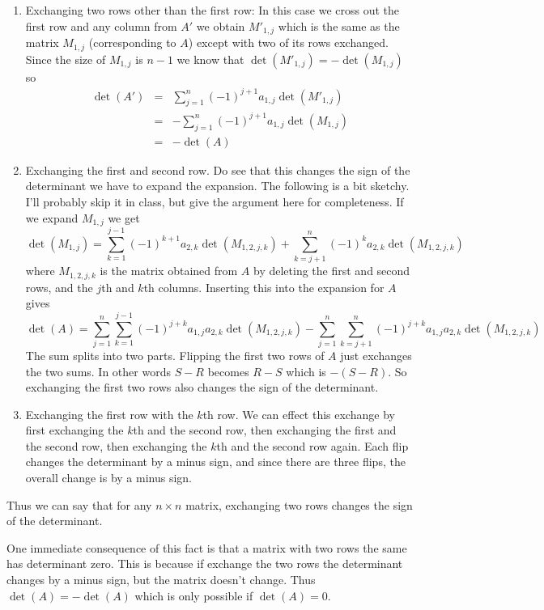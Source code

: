 \begin{enumerate}[(1)]
\item Exchanging two rows other than the first row: In this case we
cross out the first row and any column from $A'$ we obtain $M'_{1,j}$
which is the same as the matrix $M_{1,j}$ (corresponding to $A$)
except with two of its rows exchanged. Since the size of $M_{1,j}$ is
$n-1$ we know that $\det(M'_{1,j}) = - \det(M_{1,j})$ so
\begin{eqnarray*}
\det(A')&=&\sum_{j=1}^n (-1)^{j+1}a_{1,j}\det(M'_{1,j}) \\
&=&-\sum_{j=1}^n (-1)^{j+1}a_{1,j}\det(M_{1,j}) \\
&=&-\det(A)
\end{eqnarray*}
\item Exchanging the first and second row. Do see that this changes
the sign of the determinant we have to expand the expansion. The
following is a bit sketchy. I'll probably skip it in class, but give
the argument here for completeness. If we expand $M_{1,j}$ we get
\[
\det(M_{1,j}) = \sum_{k=1}^{j-1}(-1)^{k+1}a_{2,k}\det(M_{1,2,j,k})
+ \sum_{k=j+1}^{n}(-1)^{k}a_{2,k}\det(M_{1,2,j,k})
\]
where $M_{1,2,j,k}$ is the matrix obtained from $A$ by deleting the first and 
second rows, and the $j$th and $k$th columns. Inserting this into the expansion
for $A$ gives
\[
\det(A)=\sum_{j=1}^n\sum_{k=1}^{j-1}(-1)^{j+k}a_{1,j}a_{2,k}\det(M_{1,2,j,k})
-\sum_{j=1}^n\sum_{k=j+1}^{n}(-1)^{j+k}a_{1,j}a_{2,k}\det(M_{1,2,j,k})
\]
The sum splits into two parts. Flipping the first two rows of $A$ just
exchanges the two sums. In other words $S-R$ becomes $R-S$ which is
$-(S-R)$. So exchanging the first two rows also changes the sign of
the determinant.
\item Exchanging the first row with the $k$th row. We can effect this
exchange by first exchanging the $k$th and the second row, then
exchanging the first and the second row, then exchanging the $k$th and
the second row again. Each flip changes the determinant by a minus
sign, and since there are three flips, the overall change is by a
minus sign.
\end{enumerate}

Thus we can say that for any $n\times n$ matrix, exchanging two rows changes 
the sign of the determinant. 

One immediate consequence of this fact is that a matrix with two rows
the same has determinant zero. This is because if exchange the two
rows the determinant changes by a minus sign, but the matrix doesn't
change. Thus $\det(A)=-\det(A)$ which is only possible if $\det(A)=0$.

